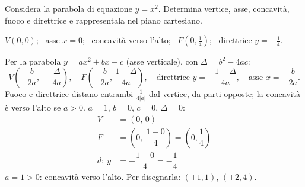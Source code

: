 
\begin{question}[ID=1.1, subtitle={Parabola $y=x^2$: vertice, asse, fuoco e direttrice}, difficulty=facile, tags={parabola, luogo}]
Considera la parabola di equazione $y=x^2$. Determina vertice, asse, concavità, fuoco e direttrice e rappresentala nel piano cartesiano.
\begin{solution}
$V(0,0)$; \ asse $x=0$; \ concavità verso l'alto; \ $F\left(0,\tfrac14\right)$; \ direttrice $y=-\tfrac14$.
\end{solution}
\begin{explanation}
Per la parabola $y=ax^2+bx+c$ (asse verticale), con $\Delta=b^2-4ac$:
\[ V\left(-\dfrac{b}{2a},\,-\dfrac{\Delta}{4a}\right), \quad F\left(-\dfrac{b}{2a},\,\dfrac{1-\Delta}{4a}\right), \quad \text{direttrice } y=-\dfrac{1+\Delta}{4a}, \quad \text{asse } x=-\dfrac{b}{2a}. \]
Fuoco e direttrice distano entrambi $\tfrac{1}{4|a|}$ dal vertice, da parti opposte; la concavità è verso l'alto se $a>0$.
$a=1$, $b=0$, $c=0$, $\Delta=0$:
\[\begin{aligned}
V &= (0,\,0)\\
F &= \left(0,\ \dfrac{1-0}{4}\right)=\left(0,\dfrac14\right)\\
d:\ y &= -\dfrac{1+0}{4}=-\dfrac14
\end{aligned}\]
$a=1>0$: concavità verso l'alto. Per disegnarla: $(\pm1,1)$, $(\pm2,4)$.
\end{explanation}
\end{question}


